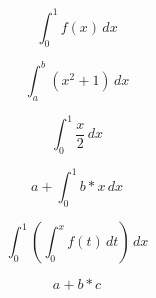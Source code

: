 \documentclass{article}
\begin{document}
\[
\int_0^1 f(x)\,dx
\]

\[
\int_a^b (x^2+1)\,dx
\]

\[
\int_0^1 \frac{x}{2}\,dx
\]

\[
a+\int_0^1 b*x\,dx
\]

\[
\int_0^1 \left(\int_0^x f(t)\,dt\right)\,dx
\]

\[
a+b*c
\]
\end{document}
